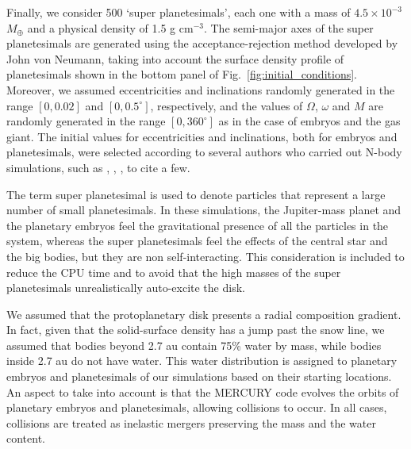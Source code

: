 \documentclass{aa}
\begin{document}
Finally, we consider 500 `super planetesimals', each one with a mass of $4.5 \times 10^{-3}$ $M_\oplus$ and a physical density of
1.5 g cm$^{-3}$. The semi-major axes of the super planetesimals are generated using the acceptance-rejection method developed by
John von Neumann, taking into account the surface density profile of planetesimals shown in the bottom panel of
Fig.~\ref{fig:initial_conditions}. Moreover, we assumed eccentricities and inclinations randomly generated in the range $[0,0.02]$
and $[0,0.5^\circ]$, respectively, and the values of $\Omega$, $\omega$ and $M$ are randomly generated in the range $[0,360^\circ]$
as in the case of embryos and the gas giant. The initial values for eccentricities and inclinations, both for embryos and planetesimals, were selected according to several authors who carried out N-body simulations, such as \citet{Raymond2004, Raymond2006, Raymond2009}, \citet{OBrien2006}, \citet{Walsh2011}, to cite a few.

The term super planetesimal is used to denote particles that represent a large number of small planetesimals. In these simulations, the Jupiter-mass planet and the planetary embryos feel the gravitational presence of all the particles in
the system, whereas the super planetesimals feel the effects of the central star and the big bodies, but they are non self-interacting.
This consideration is included to reduce the CPU time and to avoid that the high masses of the super planetesimals unrealistically
auto-excite the disk.

We assumed that the protoplanetary disk presents a radial composition gradient. In fact, given that the solid-surface density has
a jump past the snow line, we assumed that bodies beyond 2.7 au contain 75\% water by mass, while bodies inside 2.7 au do not have
water. This water distribution is assigned to planetary embryos and planetesimals of our simulations based on their starting locations.
An aspect to take into account is that the MERCURY code evolves the orbits of planetary embryos and planetesimals, allowing collisions to occur.
In all cases, collisions are treated as inelastic mergers preserving the mass and the water content.
\end{document}
